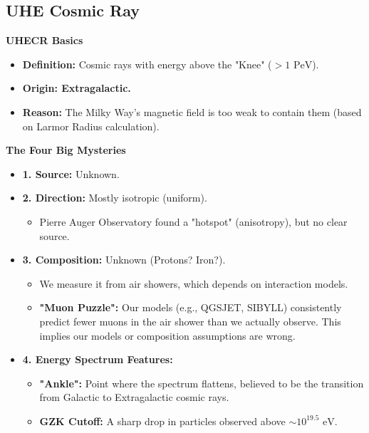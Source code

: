 \documentclass{sciposter}
\begin{document}
\begin{multicols}{3}
\section{UHE Cosmic Ray}


\textbf{UHECR Basics}
    \begin{itemize}
        \item \textbf{Definition:} Cosmic rays with energy above the "Knee" ($> 1 \text{ PeV}$).
        \item \textbf{Origin: Extragalactic.}
        \item \textbf{Reason:} The Milky Way's magnetic field is too weak to contain them (based on Larmor Radius calculation).
    \end{itemize}

\textbf{The Four Big Mysteries}
    \begin{itemize}
        \item \textbf{1. Source:} Unknown.
        \item \textbf{2. Direction:} Mostly isotropic (uniform).
            \begin{itemize}
                \item Pierre Auger Observatory found a "hotspot" (anisotropy), but no clear source.
            \end{itemize}
        \item \textbf{3. Composition:} Unknown (Protons? Iron?).
            \begin{itemize}
                \item We measure it from air showers, which depends on interaction models.
                \item \textbf{"Muon Puzzle":} Our models (e.g., QGSJET, SIBYLL) consistently predict fewer muons in the air shower than we actually observe. This implies our models or composition assumptions are wrong.
            \end{itemize}
        \item \textbf{4. Energy Spectrum Features:}
            \begin{itemize}
                \item \textbf{"Ankle":} Point where the spectrum flattens, believed to be the transition from Galactic to Extragalactic cosmic rays.
                \item \textbf{GZK Cutoff:} A sharp drop in particles observed above $\sim 10^{19.5} \text{ eV}$.
            \end{itemize}
    \end{itemize}


\end{multicols}
\end{document}
